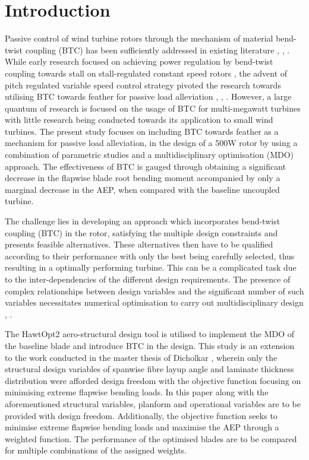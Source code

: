\documentclass[a4paper]{jpconf}
\begin{document}
\section{Introduction}
\label{sec:intro}
Passive control of wind turbine rotors through the mechanism of material bend-twist coupling (BTC) has been sufficiently addressed in existing literature \cite{kooijman1996bending}, \cite{karaolis1988active}, \cite{veers1998aeroelastic}. While early research focused on achieving power regulation by bend-twist coupling towards stall on stall-regulated constant speed rotors \cite{lobitz1996enhanced}, \cite{lobitz1999load} the advent of pitch regulated variable speed control strategy pivoted the research towards utilising BTC towards feather for passive load alleviation \cite{lobitz2003load}, \cite{lobitz2000performance}, \cite{capellaro2012design}. However, a large quantum of research is focused on the usage of BTC for multi-megawatt turbines with little research being conducted towards its application to small wind turbines. The present study focuses on including BTC towards feather as a mechanism for passive load alleviation, in the design of a 500W rotor by using a combination of parametric studies and a multidisciplinary optimisation (MDO) approach. The effectiveness of BTC is gauged through obtaining a significant decrease in the flapwise blade root bending moment accompanied by only a marginal decrease in the AEP, when compared with the baseline uncoupled turbine.

The challenge lies in developing an approach which incorporates bend-twist coupling (BTC) in the rotor, satisfying the multiple design constraints and presents feasible alternatives. These alternatives then have to be qualified according to their performance with only the best being carefully selected, thus resulting in a optimally performing turbine. This can be a complicated task due to the inter-dependencies of the different design requirements. The presence of complex relationships between design variables and the significant number of such variables necessitates numerical optimisation to carry out multidisciplinary design \cite{bottasso2012multi}, \cite{zahle2016design}.

The HawtOpt2 \cite{zahle2015aero} aero-structural design tool is utilised to implement the MDO of the baseline blade and introduce BTC in the design. This study is an extension to the work conducted in the master thesis of Dicholkar \cite{dicholkar2017numerical}, wherein only the structural design variables of spanwise fibre layup angle and laminate thickness distribution were afforded design freedom with the objective function focusing on minimising extreme flapwise bending loads. In this paper along with the aforementioned structural variables, planform and operational variables are to be provided with design freedom. Additionally, the objective function seeks to minimise extreme flapwise bending loads and maximise the AEP through a weighted function. The performance of the optimised blades are to be compared for multiple combinations of the assigned weights. 
\end{document}
